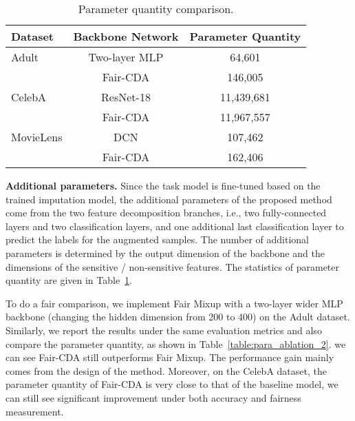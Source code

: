 \begin{table}
    \centering
    \caption{Parameter quantity comparison.}
    \label{table:para_ablation}
        \begin{tabular}{lcc}
        \hline
        \hline
        Dataset &  Backbone Network &  Parameter Quantity  \\
        \hline
        Adult  & Two-layer MLP &  64,601  \\
               & Fair-CDA      &  146,005   \\
        \hline
        CelebA & ResNet-18     & 11,439,681 \\
               & Fair-CDA      & 11,967,557 \\
        \hline
        MovieLens & DCN        & 107,462 \\
                  & Fair-CDA   & 162,406 \\
        \hline
        \hline
        \end{tabular}
\end{table}

\noindent\textbf{Additional parameters.} Since the task model is fine-tuned based on the trained imputation model, the additional parameters of the proposed method come from the two feature decomposition branches, i.e., two fully-connected layers and two classification layers, and one additional last classification layer to predict the labels for the augmented samples. The number of additional parameters is determined by the output dimension of the backbone and the dimensions of the sensitive / non-sensitive features. The statistics of parameter quantity are given in Table~\ref{table:para_ablation}.  

To do a fair comparison, we implement Fair Mixup with a two-layer wider MLP backbone (changing the hidden dimension from 200 to 400) on the Adult dataset. Similarly, we report the results under the same evaluation metrics and also compare the parameter quantity, as shown in Table~\ref{table:para_ablation_2}. we can see Fair-CDA still outperforms Fair Mixup. The performance gain mainly comes from the design of the method. Moreover, on the CelebA dataset, the parameter quantity of Fair-CDA is very close to that of the baseline model, we can still see significant improvement under both accuracy and fairness measurement.

